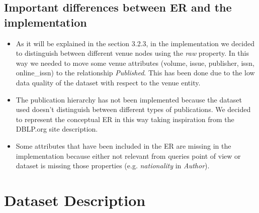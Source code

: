 \documentclass{Configuration_Files/PoliMi3i_thesis}
\begin{document}
\section{Important differences between ER and the implementation}
\begin{itemize}
    \item As it will be explained in the section 3.2.3, in the implementation we decided to distinguish between different venue
            nodes using the \emph{raw} property. In this way we needed to move some venue attributes (volume, issue, publisher, issn, online\_issn)
            to the relationship \emph{Published}. This has been done due to the low data quality of the dataset with respect to the venue entity.
    \item The publication hierarchy has not been implemented because the dataset used doesn't distinguish between different types of
            publications. We decided to represent the conceptual ER in this way taking inspiration from the DBLP.org site description.
    \item Some attributes that have been included in the ER are missing in the implementation because either not relevant from queries
            point of view or dataset is missing those properties (e.g. \emph{nationality} in \emph{Author}).
\end{itemize}

\chapter{Dataset Description}
\end{document}
